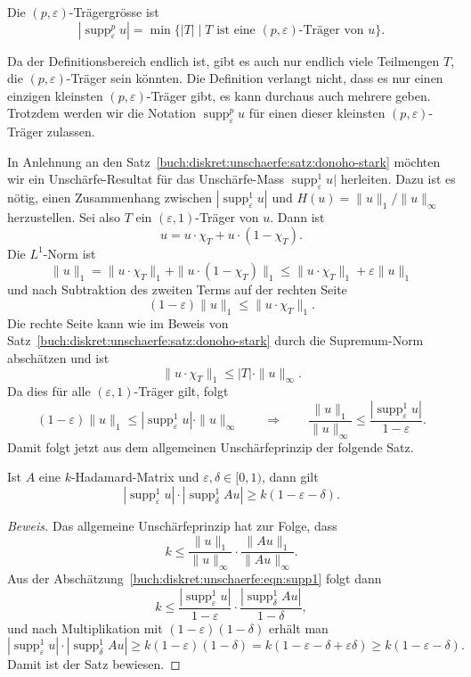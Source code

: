 \begin{definition}
Die $(p,\varepsilon)$-Trägergrösse ist
\[
|\operatorname{supp}_\varepsilon^p u|
=
\min \{ |T|\mid \text{$T$ ist eine $(p,\varepsilon)$-Träger von $u$}\}.
\]
\end{definition}

Da der Definitionsbereich endlich ist, gibt es auch nur endlich viele
Teilmengen $T$, die $(p,\varepsilon)$-Träger sein könnten.
Die Definition verlangt nicht, dass es nur einen einzigen kleinsten
$(p,\varepsilon)$-Träger gibt, es kann durchaus auch mehrere geben.
Trotzdem werden wir die Notation $\operatorname{supp}_\varepsilon^p u$
für einen dieser kleinsten $(p,\varepsilon)$-Träger zulassen.

In Anlehnung an den Satz~\ref{buch:diskret:unschaerfe:satz:donoho-stark}
möchten wir ein Unschärfe-Resultat für das Unschärfe-Mass
$\operatorname{supp}_\varepsilon^1 u|$ herleiten.
Dazu ist es nötig, einen Zusammenhang zwischen
$|\operatorname{supp}_\varepsilon^1 u|$ und $H(u) = \|u\|_1/\|u\|_\infty$ 
herzustellen.
Sei also $T$ ein $(\varepsilon,1)$-Träger von $u$.
Dann ist
\[
u = u\cdot \chi_T + u\cdot (1-\chi_T).
\]
Die $L^1$-Norm ist
\[
\|u\|_1
=
\|u\cdot \chi_T\|_1
+
\|u\cdot (1-\chi_T)\|_1
\le
\|u\cdot \chi_T\|_1
+
\varepsilon \|u\|_1
\]
und nach Subtraktion des zweiten Terms auf der rechten Seite
\[
(1-\varepsilon)\|u\|_1 \le \|u\cdot\chi_T\|_1.
\]
Die rechte Seite kann wie im Beweis von
Satz~\ref{buch:diskret:unschaerfe:satz:donoho-stark}
durch die Supremum-Norm abschätzen und ist
\[
\|u\cdot \chi_T\|_1 \le |T| \cdot \|u\|_\infty.
\]
Da dies für alle $(\varepsilon,1)$-Träger gilt, folgt
\begin{equation}
(1-\varepsilon) \|u\|_1
\le
|\operatorname{supp}_\varepsilon^1 u|\cdot \|u\|_\infty
\qquad
\Rightarrow
\qquad
\frac{\|u\|_1}{\|u\|_\infty}
\le
\frac{|\operatorname{supp}_\varepsilon^1 u|}{1-\varepsilon}.
\label{buch:diskret:unschaerfe:eqn:supp1}
\end{equation}
Damit folgt jetzt aus dem allgemeinen Unschärfeprinzip der folgende
Satz.

\begin{satz}
Ist $A$ eine $k$-Hadamard-Matrix und $\varepsilon,\delta\in [0,1)$,
dann gilt
\[
|\operatorname{supp}_\varepsilon^1 u|
\cdot
|\operatorname{supp}_\delta^1 Au|
\ge 
k(1-\varepsilon-\delta).
\]
\end{satz}

\begin{proof}[Beweis]
Das allgemeine Unschärfeprinzip hat zur Folge, dass
\[
k
\le
\frac{\|u\|_1}{\|u\|_\infty}
\cdot
\frac{\|Au\|_1}{\|Au\|_\infty}.
\]
Aus der Abschätzung~\eqref{buch:diskret:unschaerfe:eqn:supp1}
folgt dann
\[
k
\le
\frac{ |\operatorname{supp}_\varepsilon^1 u| }{ 1-\varepsilon }
\cdot
\frac{ |\operatorname{supp}_\delta^1 Au| }{ 1-\delta },
\]
und nach Multiplikation mit $(1-\varepsilon)(1-\delta)$ erhält man
\[
|\operatorname{supp}_\varepsilon^1 u|
\cdot
|\operatorname{supp}_\delta^1 Au|
\ge
k(1-\varepsilon)(1-\delta)
=
k(1-\varepsilon-\delta+\varepsilon\delta)
\ge
k(1-\varepsilon-\delta).
\]
Damit ist der Satz bewiesen.
\end{proof}

